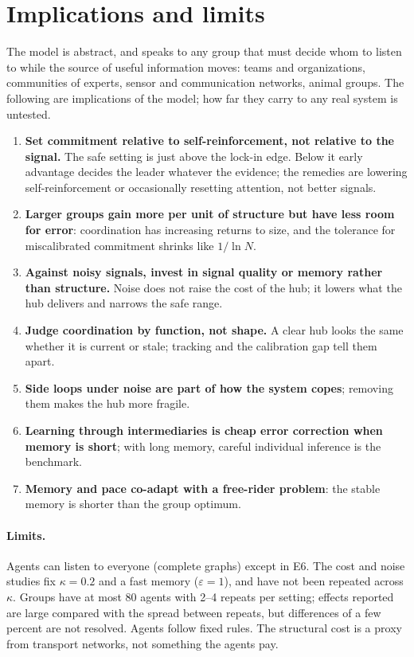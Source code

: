 \section{Implications and limits}\label{sec:implications}

The model is abstract, and speaks to any group that must decide whom to listen to while the source of useful information
moves: teams and organizations, communities of experts, sensor and communication networks, animal groups. The following
are implications of the model; how far they carry to any real system is untested.

\begin{enumerate}
  \item \textbf{Set commitment relative to self-reinforcement, not relative to the signal.} The safe setting is just above
    the lock-in edge. Below it early advantage decides the leader whatever the evidence; the remedies are lowering
    self-reinforcement or occasionally resetting attention, not better signals.
  \item \textbf{Larger groups gain more per unit of structure but have less room for error}: coordination has increasing
    returns to size, and the tolerance for miscalibrated commitment shrinks like $1/\ln N$.
  \item \textbf{Against noisy signals, invest in signal quality or memory rather than structure.} Noise does not raise the
    cost of the hub; it lowers what the hub delivers and narrows the safe range.
  \item \textbf{Judge coordination by function, not shape.} A clear hub looks the same whether it is current or stale;
    tracking and the calibration gap tell them apart.
  \item \textbf{Side loops under noise are part of how the system copes}; removing them makes the hub more fragile.
  \item \textbf{Learning through intermediaries is cheap error correction when memory is short}; with long memory,
    careful individual inference is the benchmark.
  \item \textbf{Memory and pace co-adapt with a free-rider problem}: the stable memory is shorter than the group optimum.
\end{enumerate}

\paragraph{Limits.} Agents can listen to everyone (complete graphs) except in E6. The cost and noise studies fix
$\kappa=0.2$ and a fast memory ($\varepsilon=1$), and have not been repeated across $\kappa$. Groups have at most 80 agents
with 2--4 repeats per setting; effects reported are large compared with the spread between repeats, but differences of a
few percent are not resolved. Agents follow fixed rules. The structural cost is a proxy from transport networks, not
something the agents pay.

